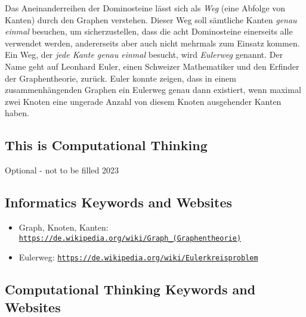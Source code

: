 \documentclass[a4paper,11pt]{report}
\newcommand{\BrochureUrlText}[1]{\texttt{#1}}
\newcommand{\taskGraphicsFolder}{..}
\begin{document}
{\centering%
\par}

Das Aneinanderreihen der Dominosteine lässt sich als \emph{Weg} (eine Abfolge von Kanten) durch den Graphen verstehen. Dieser Weg soll sämtliche Kanten \emph{genau einmal} besuchen, um sicherzustellen, dass die acht Dominosteine einerseits alle verwendet werden, andererseits aber auch nicht mehrmals zum Einsatz kommen.  Ein Weg, der \emph{jede  Kante genau einmal} besucht, wird \emph{Eulerweg} genannt. Der Name geht auf Leonhard Euler, einen Schweizer Mathematiker und den Erfinder der Graphentheorie, zurück. Euler konnte zeigen, dass in einem zusammenhängenden Graphen ein Eulerweg genau dann existiert, wenn maximal zwei Knoten eine ungerade Anzahl von diesem Knoten ausgehender Kanten haben.


\subsection*{This is Computational Thinking}

Optional - not to be filled 2023


\subsection*{Informatics Keywords and Websites}

\begin{itemize}
  \item Graph, Knoten, Kanten: \href{https://de.wikipedia.org/wiki/Graph_(Graphentheorie)}{\BrochureUrlText{https://de.wikipedia.org/wiki/Graph\_(Graphentheorie)}}
  \item Eulerweg: \href{https://de.wikipedia.org/wiki/Eulerkreisproblem}{\BrochureUrlText{https://de.wikipedia.org/wiki/Eulerkreisproblem}}
\end{itemize}


\subsection*{Computational Thinking Keywords and Websites}
\end{document}
